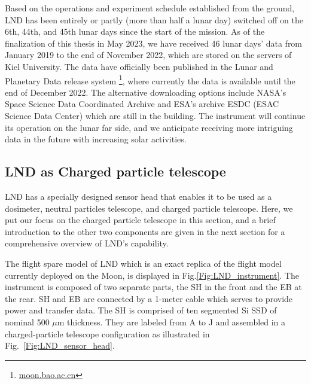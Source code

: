Based on the operations and experiment schedule established from the ground, \ac{LND} has been entirely or partly (more than half a lunar day) switched off on the 6th, 44th, and 45th lunar days since the start of the mission. As of the finalization of this thesis in May 2023, we have received 46 lunar days' data from January 2019 to the end of November 2022, which are stored on the servers of Kiel University. The data have officially been published in the Lunar and Planetary Data release system \footnote{\url{moon.bao.ac.cn}}, where currently the data is available until the end of December 2022. 
The alternative downloading options include \ac{NASA}'s Space Science Data Coordinated Archive and \ac{ESA}'s archive ESDC (ESAC Science Data Center) which are still in the building. The instrument will continue its operation on the lunar far side, and we anticipate receiving more intriguing data in the future with increasing solar activities.



\subsection*{LND as Charged particle telescope}

\ac{LND} has a specially designed sensor head that enables it to be used as a dosimeter, neutral particles telescope, and charged particle telescope. Here, we put our focus on the charged particle telescope in this section, and a brief introduction to the other two components are given in the next section for a comprehensive overview of LND's capability.

The flight spare model of \ac{LND} which is an exact replica of the flight model currently deployed on the Moon, is displayed in Fig.\ref{Fig:LND_instrument}. The instrument is composed of two separate parts, the \acl{SH} in the front and the \acl{EB} at the rear. \ac{SH} and \ac{EB} are connected by a 1-meter cable which serves to provide power and transfer data. 
The \ac{SH} is comprised of ten segmented Si \acs{SSD} of nominal 500 $\mu$m thickness. They are labeled from A to J and assembled in a charged-particle telescope configuration as illustrated in Fig.~\ref{Fig:LND_sensor_head}.

